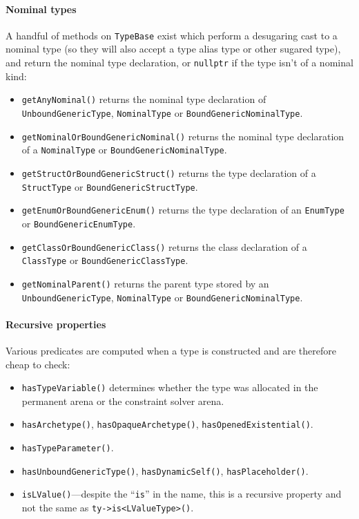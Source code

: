 \documentclass[a4paper,headsepline,bibliography=totoc,toc=flat,fleqn,twoside=semi]{scrbook}
\theoremstyle{definition}
\theoremstyle{definition}
\theoremstyle{definition}
\begin{document}
\paragraph{Nominal types} A handful of methods on \texttt{TypeBase} exist which perform a desugaring cast to a nominal type (so they will also accept a type alias type or other sugared type), and return the nominal type declaration, or \texttt{nullptr} if the type isn't of a nominal kind:
\begin{itemize}
\item \texttt{getAnyNominal()} returns the nominal type declaration of \texttt{UnboundGenericType}, \texttt{NominalType} or \texttt{BoundGenericNominalType}.
\item \texttt{getNominalOrBoundGenericNominal()} returns the nominal type declaration of a \texttt{NominalType} or \texttt{BoundGenericNominalType}.
\item \texttt{getStructOrBoundGenericStruct()} returns the type declaration of a \texttt{StructType} or \texttt{BoundGenericStructType}.
\item \texttt{getEnumOrBoundGenericEnum()} returns the type declaration of an \texttt{EnumType} or \texttt{BoundGenericEnumType}.
\item \texttt{getClassOrBoundGenericClass()} returns the class declaration of a \texttt{ClassType} or \texttt{BoundGenericClassType}.
\item \texttt{getNominalParent()} returns the parent type stored by an \texttt{UnboundGenericType}, \texttt{NominalType} or \texttt{BoundGenericNominalType}.
\end{itemize}

\paragraph{Recursive properties} Various predicates are computed when a type is constructed and are therefore cheap to check:
\begin{itemize}
\item \texttt{hasTypeVariable()} determines whether the type was allocated in the permanent arena or the constraint solver arena.
\item \texttt{hasArchetype()}, \texttt{hasOpaqueArchetype()}, \texttt{hasOpenedExistential()}.
\item \texttt{hasTypeParameter()}.
\item \texttt{hasUnboundGenericType()}, \texttt{hasDynamicSelf()}, \texttt{hasPlaceholder()}.
\item \texttt{isLValue()}---despite the ``\texttt{is}'' in the name, this is a recursive property and not the same as \verb|ty->is<LValueType>()|.
\end{itemize}
\end{document}
